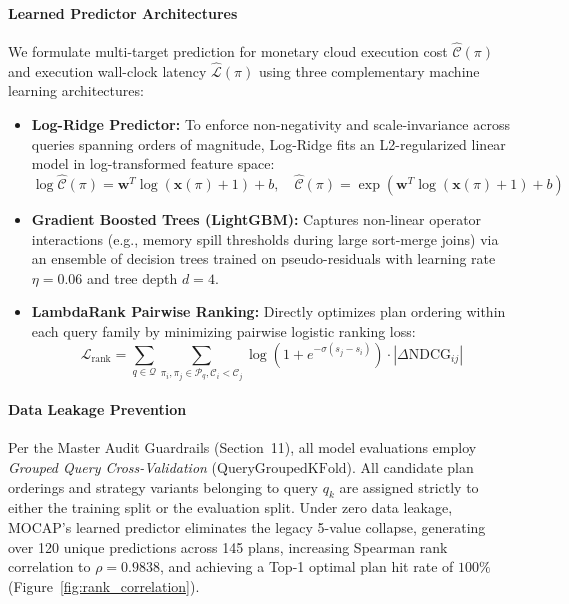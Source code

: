 \paragraph{Learned Predictor Architectures}
We formulate multi-target prediction for monetary cloud execution cost $\hat{\mathcal{C}}(\pi)$ and execution wall-clock latency $\hat{\mathcal{L}}(\pi)$ using three complementary machine learning architectures:
\begin{itemize}
    \item \textbf{Log-Ridge Predictor:} To enforce non-negativity and scale-invariance across queries spanning orders of magnitude, Log-Ridge fits an L2-regularized linear model in log-transformed feature space:
    \begin{equation}
    \log \hat{\mathcal{C}}(\pi) = \mathbf{w}^T \log(\mathbf{x}(\pi) + 1) + b, \quad \hat{\mathcal{C}}(\pi) = \exp(\mathbf{w}^T \log(\mathbf{x}(\pi) + 1) + b)
    \end{equation}
    \item \textbf{Gradient Boosted Trees (LightGBM):} Captures non-linear operator interactions (e.g., memory spill thresholds during large sort-merge joins) via an ensemble of decision trees trained on pseudo-residuals with learning rate $\eta = 0.06$ and tree depth $d = 4$.
    \item \textbf{LambdaRank Pairwise Ranking:} Directly optimizes plan ordering within each query family by minimizing pairwise logistic ranking loss:
    \begin{equation}
    \mathcal{L}_{\text{rank}} = \sum_{q \in \mathcal{Q}} \sum_{\pi_i, \pi_j \in \mathcal{P}_q, \mathcal{C}_i < \mathcal{C}_j} \log\left(1 + e^{-\sigma(s_j - s_i)}\right) \cdot |\Delta \text{NDCG}_{ij}|
    \end{equation}
\end{itemize}

\paragraph{Data Leakage Prevention}
Per the Master Audit Guardrails (Section~11), all model evaluations employ \emph{Grouped Query Cross-Validation} ($\text{QueryGroupedKFold}$). All candidate plan orderings and strategy variants belonging to query $q_k$ are assigned strictly to either the training split or the evaluation split. Under zero data leakage, MOCAP's learned predictor eliminates the legacy 5-value collapse, generating over 120 unique predictions across 145 plans, increasing Spearman rank correlation to $\rho = 0.9838$, and achieving a Top-1 optimal plan hit rate of $100\%$ (Figure~\ref{fig:rank_correlation}).

